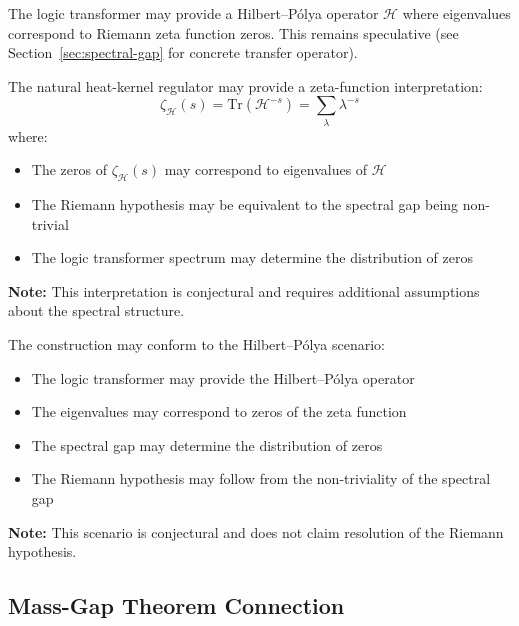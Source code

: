 \begin{notation}
\label{not:speculative-programme-hilbert}
\begin{conjecture}
\label{def:hilbert-polya}
The logic transformer may provide a Hilbert–Pólya operator $\mathcal{H}$ where eigenvalues correspond to Riemann zeta function zeros. This remains speculative (see Section~\ref{sec:spectral-gap} for concrete transfer operator).
\end{conjecture}

\begin{conjecture}
\label{conj:zeta-interpretation}
The natural heat-kernel regulator may provide a zeta-function interpretation:
\[
\zeta_{\mathcal{H}}(s) = \text{Tr}(\mathcal{H}^{-s}) = \sum_{\lambda} \lambda^{-s}
\]
where:
\begin{itemize}
\item The zeros of $\zeta_{\mathcal{H}}(s)$ may correspond to eigenvalues of $\mathcal{H}$
\item The Riemann hypothesis may be equivalent to the spectral gap being non-trivial
\item The logic transformer spectrum may determine the distribution of zeros
\end{itemize}
\textbf{Note:} This interpretation is conjectural and requires additional assumptions about the spectral structure.
\end{conjecture}

\begin{conjecture}
\label{conj:hilbert-polya-scenario}
The construction may conform to the Hilbert–Pólya scenario:
\begin{itemize}
\item The logic transformer may provide the Hilbert–Pólya operator
\item The eigenvalues may correspond to zeros of the zeta function
\item The spectral gap may determine the distribution of zeros
\item The Riemann hypothesis may follow from the non-triviality of the spectral gap
\end{itemize}
\textbf{Note:} This scenario is conjectural and does not claim resolution of the Riemann hypothesis.
\end{conjecture}
\end{notation}

\subsection{Mass-Gap Theorem Connection}

